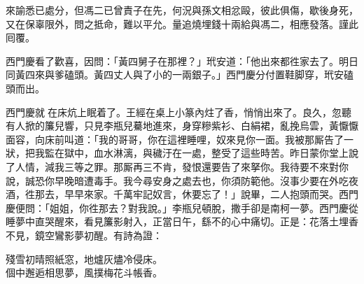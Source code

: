 \begin{myquote}[\markfont]
來諭悉已處分，但馮二已曾責子在先，何況與孫文相忿毆，彼此俱傷，歇後身死，又在保辜限外，問之抵命，難以平允。量追燒埋錢十兩給與馮二，相應發落。謹此囘覆。

\end{myquote}

西門慶看了歡喜，因問：「黃四舅子在那裡？」玳安道：「他出來都徃家去了。明日同黃四來與爹磕頭。黃四丈人與了小的一兩銀子。」西門慶分付置鞋脚穿，玳安磕頭而出。

西門慶就𢱉在床炕上眠着了。王經在桌上小篆內炷了香，悄悄出來了。良久，忽聽有人掀的簾兒響，只見李瓶兒驀地進來，身穿糝紫衫、白絹裙，亂挽烏雲，黃懨懨面容，向床前叫道：「我的哥哥，你在這裡睡哩，奴來見你一面。我被那厮告了一狀，把我監在獄中，血水淋漓，與穢汙在一處，整受了這些時苦。昨日蒙你堂上說了人情，{}減我三等之罪。那厮再三不肯，發恨還要告了來拏你。我待要不來對你說，誠恐你早晚暗遭毒手。{}我今尋安身之處去也，你須防範他。沒事少要在外吃夜酒，徃那去，早早來家。千萬牢記奴言，休要忘了！」說畢，二人抱頭而哭。西門慶便問：「姐姐，你徃那去？對我說。」李瓶兒頓脫，撒手卻是南柯一夢。西門慶從睡夢中直哭醒來，看見簾影射入，正當日午，繇不的心中痛切。正是：花落土埋香不見，鏡空鸞影夢初醒。有詩為證：

\begin{myquote} 
殘雪初晴照紙窓，地爐灰燼冷侵床。\\個中邂逅相思夢，風撲梅花斗帳香。
\end{myquote} 

